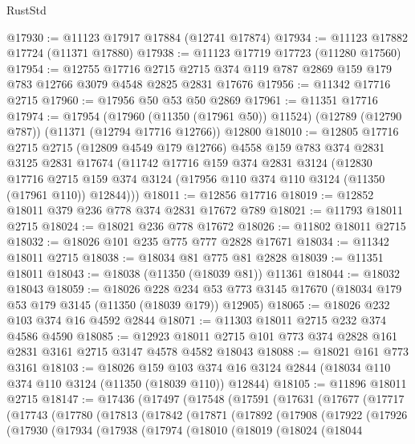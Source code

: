 \begin{lexlean}{RustStd}
\begin{coremodule}
{\begin{coremodule}
{{{{{{{{{{{{{{{{{{{{{{{{{{{{{{{{{@17930 := @11123 @17917 @17884 (@12741 @17874)
@17934 := @11123 @17882 @17724 (@11371 @17880)
@17938 := @11123 @17719 @17723 (@11280 @17560)
@17954 := @12755
    @17716
    @2715
    @2715
    @374
    @119
    @787
    @2869
    @159
    @179
    @783
    @12766
    @3079
    @4548
    @2825
    @2831
    @17676
@17956 := @11342 @17716 @2715
@17960 := @17956 @50 @53 @50 @2869
@17961 := @11351 @17716
@17974 := @17954
    (@17960 (@11350 (@17961 @50)) @11524)
    (@12789 (@12790 @787))
    (@11371 (@12794 @17716 @12766))
    @12800
@18010 := @12805
    @17716
    @2715
    @2715
    (@12809 @4549 @179 @12766)
    @4558
    @159
    @783
    @374
    @2831
    @3125
    @2831
    @17674
    (@11742
      @17716
      @159
      @374
      @2831
      @3124
      (@12830
        @17716
        @2715
        @159
        @374
        @3124
        (@17956 @110 @374 @110 @3124 (@11350 (@17961 @110)) @12844)))
@18011 := @12856 @17716
@18019 := @12852 @18011 @379 @236 @778 @374 @2831 @17672 @789
@18021 := @11793 @18011 @2715
@18024 := @18021 @236 @778 @17672
@18026 := @11802 @18011 @2715
@18032 := @18026 @101 @235 @775 @777 @2828 @17671
@18034 := @11342 @18011 @2715
@18038 := @18034 @81 @775 @81 @2828
@18039 := @11351 @18011
@18043 := @18038 (@11350 (@18039 @81)) @11361
@18044 := @18032 @18043
@18059 := @18026
    @228
    @234
    @53
    @773
    @3145
    @17670
    (@18034 @179 @53 @179 @3145 (@11350 (@18039 @179)) @12905)
@18065 := @18026 @232 @103 @374 @16 @4592 @2844
@18071 := @11303 @18011 @2715 @232 @374 @4586 @4590
@18085 := @12923 @18011 @2715 @101 @773 @374 @2828 @161 @2831 @3161 @2715 @3147 @4578 @4582 @18043
@18088 := @18021 @161 @773 @3161
@18103 := @18026
    @159
    @103
    @374
    @16
    @3124
    @2844
    (@18034 @110 @374 @110 @3124 (@11350 (@18039 @110)) @12844)
@18105 := @11896 @18011 @2715
@18147 := @17436
    (@17497
      (@17548
        (@17591
          (@17631
            (@17677
              (@17717
                (@17743
                  (@17780
                    (@17813
                      (@17842
                        (@17871
                          (@17892
                            (@17908
                              (@17922
                                (@17926
                                  (@17930
                                    (@17934
                                      (@17938
                                        (@17974
                                          (@18010
                                            (@18019
                                              (@18024
                                                (@18044
}}}}}}}}}}}}}}}}}}}}}}}}}}}}}}}}}
\end{coremodule}}
\end{coremodule}
\end{lexlean}
